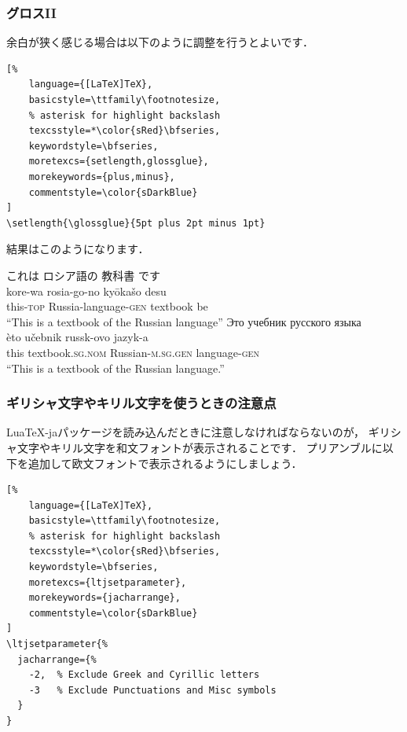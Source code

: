 \documentclass[
    12pt,
    unicode]{beamer}
\begin{document}
\begin{frame}[fragile]
\setlength{\glossglue}{5pt plus 2pt minus 1pt}\footnotesize
\frametitle{グロスII}
余白が狭く感じる場合は以下のように調整を行うとよいです．
\begin{leftbar}
\begin{lstlisting}[%
    language={[LaTeX]TeX},
    basicstyle=\ttfamily\footnotesize,
    % asterisk for highlight backslash
    texcsstyle=*\color{sRed}\bfseries,
    keywordstyle=\bfseries,
    moretexcs={setlength,glossglue},
    morekeywords={plus,minus},
    commentstyle=\color{sDarkBlue}
]
\setlength{\glossglue}{5pt plus 2pt minus 1pt}
\end{lstlisting}
\end{leftbar}

結果はこのようになります．
\begin{exe}
    \ex%
    \glll%
    {これは} {ロシア語の} {教科書} {です} \\
    {kore-wa} {rosia-go-no} {kyōkašo} {desu} \\
    {this-\textsc{top}} {Russia-language-\textsc{gen}} {textbook} {be} \\
    \trans%
    ``This is a textbook of the Russian language''
    \ex%
    \glll%
    {Это} {учебник} {русского} {языка} \\
    {èto} {učebnik} {russk-ovo} {jazyk-a} \\
    {this} {textbook.\textsc{sg.nom}} {Russian-\textsc{m.sg.gen}} {language-\textsc{gen}} \\
    \trans%
    ``This is a textbook of the Russian language.''
\end{exe}
\end{frame}


\begin{frame}[fragile]
\frametitle{ギリシャ文字やキリル文字を使うときの注意点}
Lua\TeX{}-jaパッケージを読み込んだときに注意しなければならないのが，
ギリシャ文字やキリル文字を和文フォントが表示されることです．
プリアンブルに以下を追加して欧文フォントで表示されるようにしましょう．
\begin{leftbar}
\begin{lstlisting}[%
    language={[LaTeX]TeX},
    basicstyle=\ttfamily\footnotesize,
    % asterisk for highlight backslash
    texcsstyle=*\color{sRed}\bfseries,
    keywordstyle=\bfseries,
    moretexcs={ltjsetparameter},
    morekeywords={jacharrange},
    commentstyle=\color{sDarkBlue}
]
\ltjsetparameter{%
  jacharrange={%
    -2,  % Exclude Greek and Cyrillic letters
    -3   % Exclude Punctuations and Misc symbols
  }
}
\end{lstlisting}
\end{leftbar}
\end{frame}
\end{document}

